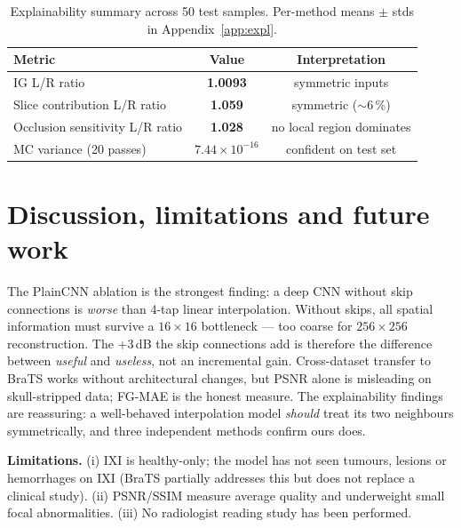 \documentclass[10pt,a4paper]{article}
\begin{document}
\begin{table}[h]
    \centering
    \footnotesize
    \begin{tabular}{lcc}
        \toprule
        Metric                                & Value                          & Interpretation \\
        \midrule
        IG L/R ratio                          & \textbf{1.0093}                & symmetric inputs \\
        Slice contribution L/R ratio          & \textbf{1.059}                 & symmetric ($\sim$6\,\%) \\
        Occlusion sensitivity L/R ratio       & \textbf{1.028}                 & no local region dominates \\
        MC variance (20 passes)               & $7.44\!\times\!10^{-16}$       & confident on test set \\
        \bottomrule
    \end{tabular}
    \caption{Explainability summary across 50 test samples. Per-method
    means $\pm$ stds in Appendix~\ref{app:expl}.}
    \label{tab:expl}
\end{table}

\section{Discussion, limitations and future work}

The PlainCNN ablation is the strongest finding: a deep CNN without skip
connections is \emph{worse} than 4-tap linear interpolation. Without skips,
all spatial information must survive a $16{\times}16$ bottleneck --- too
coarse for $256{\times}256$ reconstruction. The $+3$\,dB the skip
connections add is therefore the difference between \emph{useful} and
\emph{useless}, not an incremental gain. Cross-dataset transfer to BraTS
works without architectural changes, but PSNR alone is misleading on
skull-stripped data; FG-MAE is the honest measure. The explainability
findings are reassuring: a well-behaved interpolation model \emph{should}
treat its two neighbours symmetrically, and three independent methods
confirm ours does.

\textbf{Limitations.} (i) IXI is healthy-only; the model has not seen
tumours, lesions or hemorrhages on IXI (BraTS partially addresses this
but does not replace a clinical study). (ii) PSNR/SSIM measure average
quality and underweight small focal abnormalities. (iii) No radiologist
reading study has been performed.
\end{document}
